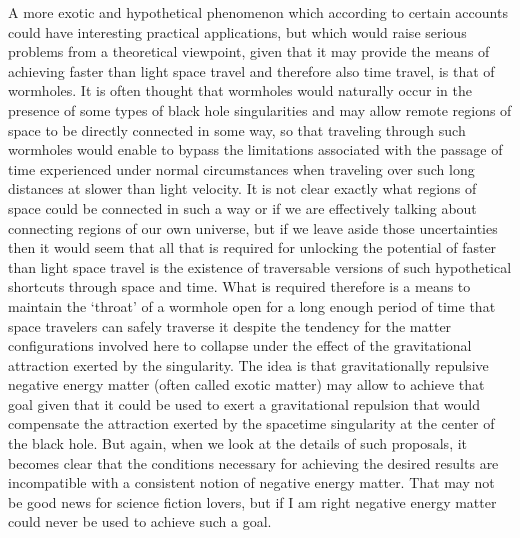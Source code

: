 \documentclass[notitlepage,12pt]{report}
\begin{document}
A more exotic and hypothetical phenomenon which according to certain accounts could have interesting practical applications, but which would raise serious problems from a theoretical viewpoint, given that it may provide the means of achieving faster than light space travel and therefore also time travel, is that of wormholes. It is often thought that wormholes would naturally occur in the presence of some types of black hole singularities and may allow remote regions of space to be directly connected in some way, so that traveling through such wormholes would enable to bypass the limitations associated with the passage of time experienced under normal circumstances when traveling over such long distances at slower than light velocity. It is not clear exactly what regions of space could be connected in such a way or if we are effectively talking about connecting regions of our own universe, but if we leave aside those uncertainties then it would seem that all that is required for unlocking the potential of faster than light space travel is the existence of traversable versions of such hypothetical shortcuts through space and time. What is required therefore is a means to maintain the `throat' of a wormhole open for a long enough period of time that space travelers can safely traverse it despite the tendency for the matter configurations involved here to collapse under the effect of the gravitational attraction exerted by the singularity. The idea is that gravitationally repulsive negative energy matter (often called exotic matter) may allow to achieve that goal given that it could be used to exert a gravitational repulsion that would compensate the attraction exerted by the spacetime singularity at the center of the black hole. But again, when we look at the details of such proposals, it becomes clear that the conditions necessary for achieving the desired results are incompatible with a consistent notion of negative energy matter. That may not be good news for science fiction lovers, but if I am right negative energy matter could never be used to achieve such a goal.
\end{document}
